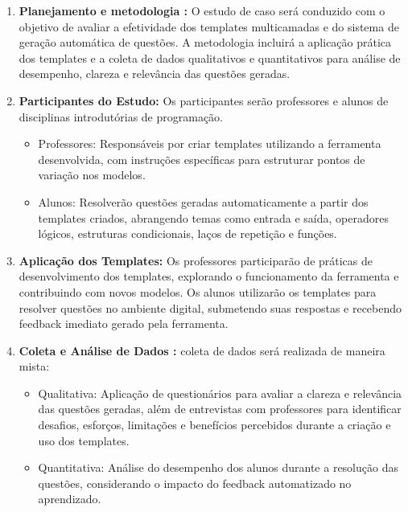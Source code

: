 \begin{enumerate}[label=\textbf{\alph*)}]
    \item \textbf{Planejamento e metodologia :}  O estudo de caso será conduzido com o objetivo de avaliar a efetividade dos templates multicamadas e do sistema de geração automática de questões. A metodologia incluirá a aplicação prática dos templates e a coleta de dados qualitativos e quantitativos para análise de desempenho, clareza e relevância das questões geradas. 

    \item \textbf{Participantes do Estudo:}  Os participantes serão professores e alunos de disciplinas introdutórias de programação.

\begin{itemize}
    \item Professores: Responsáveis por criar templates utilizando a ferramenta desenvolvida, com instruções específicas para estruturar pontos de variação nos modelos.
    \item Alunos: Resolverão questões geradas automaticamente a partir dos templates criados, abrangendo temas como entrada e saída, operadores lógicos, estruturas condicionais, laços de repetição e funções.
\end{itemize}
 
    \item \textbf{Aplicação dos Templates: }  Os professores participarão de práticas de desenvolvimento dos templates, explorando o funcionamento da ferramenta e contribuindo com novos modelos. Os alunos utilizarão os templates para resolver questões no ambiente digital, submetendo suas respostas e recebendo feedback imediato gerado pela ferramenta. 
    \item \textbf{Coleta e Análise de Dados :} coleta de dados será realizada de maneira mista:

\begin{itemize}
    \item Qualitativa: Aplicação de questionários para avaliar a clareza e relevância das questões geradas, além de entrevistas com professores para identificar desafios, esforços, limitações e benefícios percebidos durante a criação e uso dos templates.
    \item Quantitativa: Análise do desempenho dos alunos durante a resolução das questões, considerando o impacto do feedback automatizado no aprendizado.
\end{itemize}


\end{enumerate}

